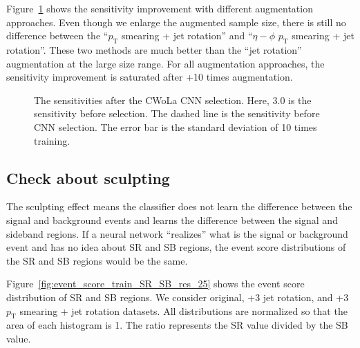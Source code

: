 \documentclass[12pt]{article}
\begin{document}
		Figure~\ref{fig:sensitivity_improvement_summary_aug_3_to_33_SB_3} shows the sensitivity improvement with different augmentation approaches. Even though we enlarge the augmented sample size, there is still no difference between the ``$p_{\text{T}}$ smearing + jet rotation'' and ``$\eta-\phi$ $p_{\text{T}}$ smearing + jet rotation''. These two methods are much better than the ``jet rotation'' augmentation at the large size range. For all augmentation approaches, the sensitivity improvement is saturated after +10 times augmentation.
		\begin{figure}[htpb]
			\centering
			\caption{The sensitivities after the CWoLa CNN selection. Here, $3.0$ is the sensitivity before selection. The dashed line is the sensitivity before CNN selection. The error bar is the standard deviation of 10 times training.}
			\label{fig:sensitivity_improvement_summary_aug_3_to_33_SB_3}
		\end{figure}
	\subsection{Check about sculpting}%
	\label{sub:check_about_sculpting}
		The sculpting effect means the classifier does not learn the difference between the signal and background events and learns the difference between the signal and sideband regions. If a neural network ``realizes'' what is the signal or background event and has no idea about SR and SB regions, the event score distributions of the SR and SB regions would be the same.

		Figure~\ref{fig:event_score_train_SR_SB_res_25} shows the event score distribution of SR and SB regions. We consider original, +3 jet rotation, and +3 $p_{\text{T}}$ smearing + jet rotation datasets. All distributions are normalized so that the area of each histogram is 1. The ratio represents the SR value divided by the SB value.
\end{document}

